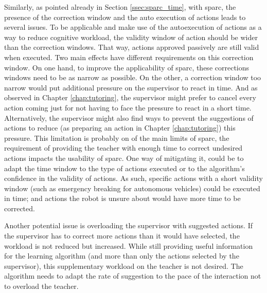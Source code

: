 Similarly, as pointed already in Section \ref{ssec:sparc_time}, with \gls{sparc}, the presence of the correction window and the auto execution of actions leads to several issues. To be applicable and make use of the autoexecution of actions as a way to reduce cognitive workload, the validity window of action should be wider than the correction windows. That way, actions approved passively are still valid when executed. Two main effects have different requirements on this correction window. On one hand, to improve the applicability of \gls{sparc}, these corrections windows need to be as narrow as possible. On the other, a correction window too narrow would put additional pressure on the supervisor to react in time. And as observed in Chapter \ref{chap:tutoring}, the supervisor might prefer to cancel every action coming just for not having to face the pressure to react in a short time. Alternatively, the supervisor might also find ways to prevent the suggestions of actions to reduce (as preparing an action in Chapter \ref{chap:tutoring}) this pressure. This limitation is probably on of the main limits of \gls{sparc}, the requirement of providing the teacher with enough time to correct undesired actions impacts the usability of \gls{sparc}. One way of mitigating it, could be to adapt the time window to the type of actions executed or to the algorithm's confidence in the validity of actions. As such, specific actions with a short validity window (such as emergency breaking for autonomous vehicles) could be executed in time; and actions the robot is unsure about would have more time to be corrected. 

Another potential issue is overloading the supervisor with suggested actions. If the supervisor has to correct more actions than it would have selected, the workload is not reduced but increased. While still providing useful information for the learning algorithm (and more than only the actions selected by the supervisor), this supplementary workload on the teacher is not desired. The algorithm needs to adapt the rate of suggestion to the pace of the interaction not to overload the teacher.

